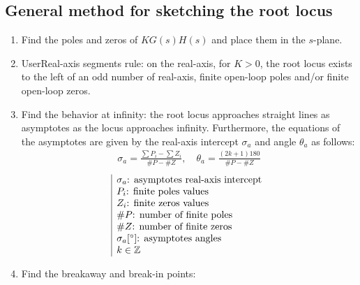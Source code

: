 \documentclass[10pt, twocolumn]{article}
\begin{document}
\subsection{General method for sketching the root locus}
\begin{enumerate}
  \item Find the poles and zeros of \(KG(s)H(s)\) and place them in the \(s\)-plane.
  \item UserReal-axis segments rule: on the real-axis, for \(K > 0\), the root locus exists to the left of an odd number of real-axis, finite open-loop poles and/or finite open-loop zeros.
  \item Find the behavior at infinity: the root locus approaches straight lines as asymptotes as the locus approaches infinity.
        Furthermore, the equations of the asymptotes are given by the real-axis intercept \(\sigma_a\) and angle \(\theta_a\) as follows:
        \begin{align*}
          \sigma_a = \frac{\sum{P_i} - \sum{Z_i}}{\#P - \#Z}, \quad \theta_a = \frac{(2k + 1) 180}{\#P - \#Z}
        \end{align*}
        \[
          \begin{array}{|l}
            \sigma_a \text{: asymptotes real-axis intercept}   \\
            P_i \text{: finite poles values}                   \\
            Z_i \text{: finite zeros values}                   \\
            \#P \text{: number of finite poles}                \\
            \#Z \text{: number of finite zeros}                \\
            \sigma_a [\si{\degree}] \text{: asymptotes angles} \\
            k \in \mathbb{Z}_{}^{}
          \end{array}
        \]
  \item Find the breakaway and break-in points:
\end{enumerate}
\end{document}
